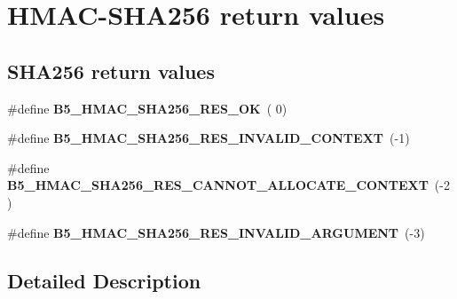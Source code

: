 \hypertarget{group__hmacsha_return}{\section{H\-M\-A\-C-\/\-S\-H\-A256 return values}
\label{group__hmacsha_return}
}
\subsection*{S\-H\-A256 return values}
\begin{DoxyCompactItemize}
\item 
\hypertarget{group__sha_return_ga0e5f89b7755c8f732ed35deec05da229}{\#define {\bfseries B5\-\_\-\-H\-M\-A\-C\-\_\-\-S\-H\-A256\-\_\-\-R\-E\-S\-\_\-\-O\-K}~( 0)}\label{group__sha_return_ga0e5f89b7755c8f732ed35deec05da229}

\item 
\hypertarget{group__sha_return_ga3ff9a0202a85c089dc8bcf233ec1ab91}{\#define {\bfseries B5\-\_\-\-H\-M\-A\-C\-\_\-\-S\-H\-A256\-\_\-\-R\-E\-S\-\_\-\-I\-N\-V\-A\-L\-I\-D\-\_\-\-C\-O\-N\-T\-E\-X\-T}~(-\/1)}\label{group__sha_return_ga3ff9a0202a85c089dc8bcf233ec1ab91}

\item 
\hypertarget{group__sha_return_gacff6d96c063b8e79061f78d0635fea32}{\#define {\bfseries B5\-\_\-\-H\-M\-A\-C\-\_\-\-S\-H\-A256\-\_\-\-R\-E\-S\-\_\-\-C\-A\-N\-N\-O\-T\-\_\-\-A\-L\-L\-O\-C\-A\-T\-E\-\_\-\-C\-O\-N\-T\-E\-X\-T}~(-\/2)}\label{group__sha_return_gacff6d96c063b8e79061f78d0635fea32}

\item 
\hypertarget{group__sha_return_ga5c102e416cabfba16db0f9ec5731cced}{\#define {\bfseries B5\-\_\-\-H\-M\-A\-C\-\_\-\-S\-H\-A256\-\_\-\-R\-E\-S\-\_\-\-I\-N\-V\-A\-L\-I\-D\-\_\-\-A\-R\-G\-U\-M\-E\-N\-T}~(-\/3)}\label{group__sha_return_ga5c102e416cabfba16db0f9ec5731cced}

\end{DoxyCompactItemize}


\subsection{Detailed Description}
